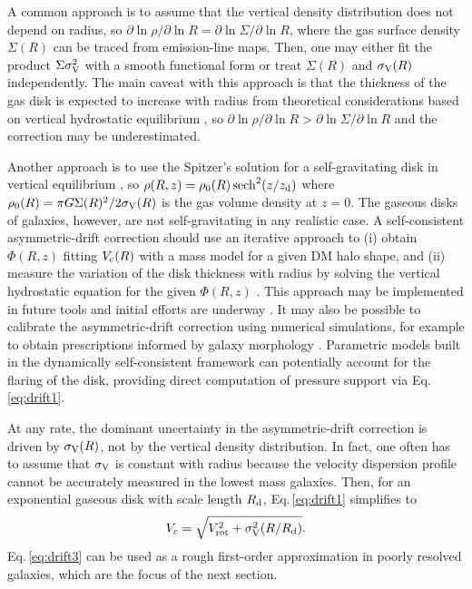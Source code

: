 \documentclass[a4paper,11pt]{article}
\DeclareMathOperator{\sech}{sech}
\begin{document}
A common approach \citep{Meurer1996, Lelli2014a} is to assume that the vertical density distribution does not depend on radius, so $\partial \ln \rho / \partial \ln R = \partial \ln \Sigma / \partial \ln R$, where the gas surface density $\Sigma(R)$ can be traced from emission-line maps. Then, one may either fit the product $\Sigma \sigma_{\rm V}^2$ with a smooth functional form \citep{Iorio2017} or treat $\Sigma(R)$ and $\sigma_{\rm V}(R)$ independently. The main caveat with this approach is that the thickness of the gas disk is expected to increase with radius from theoretical considerations based on vertical hydrostatic equilibrium \citep{Romeo1992, Olling1995, Bacchini2020}, so $\partial \ln \rho / \partial \ln R > \partial \ln \Sigma / \partial \ln R$ and the correction may be underestimated.

Another approach \citep{Burkert2010} is to use the Spitzer's solution for a self-gravitating disk in vertical equilibrium \citep{Spitzer1942}, so $\rho(R, z) = \rho_{0}(R) \sech^2(z/z_{\rm d})$ where $\rho_{0}(R) = \pi G \Sigma(R)^2/2\sigma_{\rm V}(R)$ is the gas volume density at $z=0$. The gaseous disks of galaxies, however, are not self-gravitating in any realistic case. A self-consistent asymmetric-drift correction should use an iterative approach to (i) obtain $\Phi(R, z)$ fitting $V_{\rm c}(R)$ with a mass model for a given DM halo shape, and (ii) measure the variation of the disk thickness with radius by solving the vertical hydrostatic equation for the given $\Phi(R, z)$ \citep{Bacchini2020}. This approach may be implemented in future tools and initial efforts are underway \citep[e.g.,][]{ManceraPina2025}. 
It may also be possible to calibrate the asymmetric-drift correction using numerical simulations, for example to obtain prescriptions informed by galaxy morphology \citep{Kretschmer2021}. Parametric models built in the dynamically self-consistent framework can potentially account for the flaring of the disk, providing direct computation of pressure support via Eq.\,\ref{eq:drift1}.

At any rate, the dominant uncertainty in the asymmetric-drift correction is driven by $\sigma_{\rm V}(R)$, not by the vertical density distribution. In fact, one often has to assume that $\sigma_{\rm V}$ is constant with radius because the velocity dispersion profile cannot be accurately measured in the lowest mass galaxies. Then, for an exponential gaseous disk with scale length $R_{\rm d}$, Eq.\,\ref{eq:drift1} simplifies to 
\begin{equation}\label{eq:drift3}
V_c =\sqrt{V_{\rm rot}^2 + \sigma_{\rm V}^2(R/R_{\rm d})}.
\end{equation}
Eq.\,\ref{eq:drift3} can be used as a rough first-order approximation in poorly resolved galaxies, which are the focus of the next section.
\end{document}
